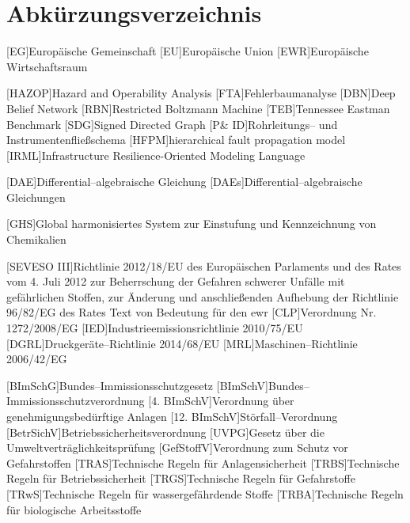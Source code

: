 \chapter*{Abk\"urzungsverzeichnis}
\begin{acronym}[12. BImSchV] %
	[EG]{Europ\"aische Gemeinschaft} %
	[EU]{Europ\"aische Union} %
	[EWR]{Europ\"aische Wirtschaftsraum }
	
	[HAZOP]{Hazard and Operability Analysis}
	[FTA]{Fehlerbaumanalyse }
	[DBN]{Deep Belief Network}
	[RBN]{Restricted Boltzmann Machine}
	[TEB]{Tennessee Eastman Benchmark}
	[SDG]{Signed Directed Graph}
	[P\& ID]{Rohrleitungs-- und Instrumentenflie\ss{}schema }
	[HFPM]{hierarchical fault propagation model}
	[IRML]{Infrastructure Resilience-Oriented Modeling Language}
	
	[DAE]{Differential--algebraische Gleichung }
	[DAEs]{Differential--algebraische Gleichungen }
	
	[GHS]{Global harmonisiertes System zur Einstufung und Kennzeichnung von Chemikalien}
		
	[SEVESO III]{Richtlinie 2012/18/EU des Europ\"aischen Parlaments und des Rates vom 4. Juli 2012 zur Beherrschung der Gefahren schwerer Unf\"alle mit gef\"ahrlichen Stoffen, zur \"Anderung und anschlie\ss{}enden Aufhebung der Richtlinie 96/82/EG des Rates Text von Bedeutung f\"ur den \ac{ewr}}
	[CLP]{Verordnung Nr. 1272/2008/EG}
	[IED]{Industrieemissionsrichtlinie 2010/75/EU}
	[DGRL]{Druckger\"ate--Richtlinie 2014/68/EU}
	[MRL]{Maschinen--Richtlinie 2006/42/EG}
	
	[BImSchG]{Bundes--Immissionsschutzgesetz}
	[BImSchV]{Bundes--Immissionsschutzverordnung}
  [4. BImSchV]{Verordnung \"uber genehmigungsbed\"urftige Anlagen}
	[12. BImSchV]{St\"orfall--Verordnung}
	[BetrSichV]{Betriebssicherheitsverordnung}
	[UVPG]{Gesetz \"uber die Umweltvertr\"aglichkeitspr\"ufung}
	[GefStoffV]{Verordnung zum Schutz vor Gefahrstoffen}
	[TRAS]{Technische Regeln f\"ur Anlagensicherheit}
	[TRBS]{Technische Regeln f\"ur Betriebssicherheit}
	[TRGS]{Technische Regeln f\"ur Gefahrstoffe}
	[TRwS]{Technische Regeln f\"ur wassergef\"ahrdende Stoffe}
	[TRBA]{Technische Regeln f\"ur biologische Arbeitsstoffe}
\end{acronym}